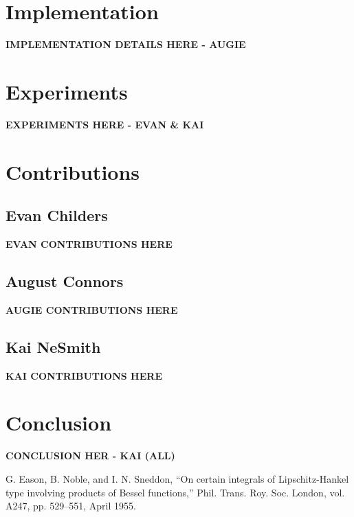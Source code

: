 \documentclass[conference]{IEEEtran}
\begin{document}
\section{Implementation}
\textbf{IMPLEMENTATION DETAILS HERE - AUGIE}

\section{Experiments}
\textbf{EXPERIMENTS HERE - EVAN \& KAI}

\section{Contributions}
\subsection{Evan Childers}
\textbf{EVAN CONTRIBUTIONS HERE}
\subsection{August Connors}
\textbf{AUGIE CONTRIBUTIONS HERE}
\subsection{Kai NeSmith}
\textbf{KAI CONTRIBUTIONS HERE}

\section{Conclusion}
\textbf{CONCLUSION HER - KAI (ALL)}

\begin{thebibliography}{00}
 G. Eason, B. Noble, and I. N. Sneddon, ``On certain integrals of Lipschitz-Hankel type involving products of Bessel functions,'' Phil. Trans. Roy. Soc. London, vol. A247, pp. 529--551, April 1955.
\end{thebibliography}
\end{document}
